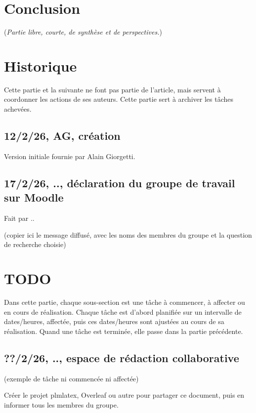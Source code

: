 \documentclass[a4paper]{article}
\begin{document}
\section{Conclusion}

(\textit{Partie libre, courte, de synthèse et de perspectives.})



\renewcommand{\refname}{Références}



\clearpage

\appendix

\section{Historique}

Cette partie et la suivante ne font pas partie de l'article, mais servent à
coordonner les actions de ses auteurs. Cette partie sert à archiver les tâches
achevées.

\subsection{12/2/26, AG, création}

Version initiale fournie par Alain Giorgetti.

\subsection{17/2/26, .., déclaration du groupe de travail sur Moodle}

Fait par ..

(copier ici le message diffusé, avec les noms des membres du groupe et la
question de recherche choisie)

\section{TODO}

Dans cette partie, chaque sous-section est une tâche à commencer, à affecter ou
en cours de réalisation. Chaque tâche est d'abord planifiée sur un intervalle de
dates/heures, affectée, puis ces dates/heures sont ajustées au cours de sa
réalisation. Quand une tâche est terminée, elle passe dans la partie précédente.

\subsection{??/2/26, .., espace de rédaction collaborative}

(exemple de tâche ni commencée ni affectée)

Créer le projet plmlatex, Overleaf ou autre pour partager ce document, puis en
informer tous les membres du groupe.
\end{document}
